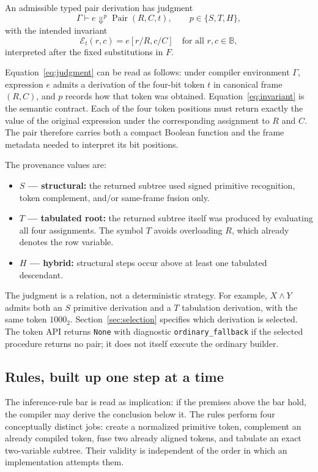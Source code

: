 \documentclass[10pt]{article}
\newcommand{\B}{\mathbb B}
\newcommand{\Pair}{\operatorname{Pair}}
\newcommand{\eval}{\mathcal E}
\theoremstyle{plain}
\theoremstyle{definition}
\theoremstyle{remark}
\begin{document}
An admissible typed pair derivation has judgment
\begin{equation}
 \Gamma\vdash e\Downarrow^p \Pair(R,C,t),
 \qquad p\in\{S,T,H\},
 \label{eq:judgment}
\end{equation}
with the intended invariant
\begin{equation}
 \eval_t(r,c)=e[r/R,c/C]
 \quad\text{for all }r,c\in\B,
 \label{eq:invariant}
\end{equation}
interpreted after the fixed substitutions in $F$.

Equation~\eqref{eq:judgment} can be read as follows: under compiler environment $\Gamma$, expression $e$ admits a derivation of the four-bit token $t$ in canonical frame $(R,C)$, and $p$ records how that token was obtained. Equation~\eqref{eq:invariant} is the semantic contract. Each of the four token positions must return exactly the value of the original expression under the corresponding assignment to $R$ and $C$. The pair therefore carries both a compact Boolean function and the frame metadata needed to interpret its bit positions.

The provenance values are:
\begin{itemize}
 \item \textbf{$S$ --- structural:} the returned subtree used signed primitive recognition, token complement, and/or same-frame fusion only.
 \item \textbf{$T$ --- tabulated root:} the returned subtree itself was produced by evaluating all four assignments. The symbol $T$ avoids overloading $R$, which already denotes the row variable.
 \item \textbf{$H$ --- hybrid:} structural steps occur above at least one tabulated descendant.
\end{itemize}
The judgment is a relation, not a deterministic strategy. For example, $X\land Y$ admits both an $S$ primitive derivation and a $T$ tabulation derivation, with the same token $1000_2$. Section~\ref{sec:selection} specifies which derivation is selected. The token API returns \texttt{None} with diagnostic \texttt{ordinary\_fallback} if the selected procedure returns no pair; it does not itself execute the ordinary builder.

\subsection{Rules, built up one step at a time}

The inference-rule bar is read as implication: if the premises above the bar hold, the compiler may derive the conclusion below it. The rules perform four conceptually distinct jobs: create a normalized primitive token, complement an already compiled token, fuse two already aligned tokens, and tabulate an exact two-variable subtree. Their validity is independent of the order in which an implementation attempts them.
\end{document}
